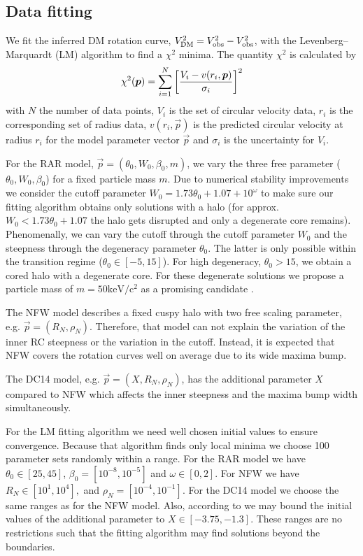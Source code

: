 \subsection{Data fitting}
We fit the inferred DM rotation curve, $V_\mathrm{DM}^2 = V_\mathrm{obs}^2 - V_\mathrm{obs}^2$, with the Levenberg–Marquardt (LM) algorithm to find a $\chi^2$ minima. The quantity $\chi^2$ is calculated by \begin{equation}
	\chi^2(\vec p) = \sum \limits_{i=1}^N \qbracket{\frac{V_i - v(r_i,\vec p)}{\sigma_i}}^2
\end{equation} with $N$ the number of data points, $V_i$ is the set of circular velocity data, $r_i$ is the corresponding set of radius data, $v(r_i,\vec p)$ is the predicted circular velocity at radius $r_i$ for the model parameter vector $\vec p$ and $\sigma_i$ is the uncertainty for $V_i$.

For the RAR model, $\vec p = (\theta_0, W_0, \beta_0, m)$, we vary the three free parameter ($\theta_0, W_0, \beta_0$) for a fixed particle mass $m$. Due to numerical stability improvements we consider the cutoff parameter $W_0 =  1.73 \theta_0 + 1.07 + 10^\omega$ to make sure our fitting algorithm obtains only solutions with a halo (for approx. $W_0 < 1.73 \theta_0 + 1.07$ the halo gets disrupted and only a degenerate core remains). Phenomenally, we can vary the cutoff through the cutoff parameter $W_0$ and the steepness through the degeneracy parameter $\theta_0$. The latter is only possible within the transition regime ($\theta_0 \in [-5,15]$). For high degeneracy, $\theta_0 > 15$, we obtain a cored halo with a degenerate core. For these degenerate solutions we propose a particle mass of $m = 50 \mathrm{keV/c^2}$ as a promising candidate \citep{RAR-II}.

The NFW model describes a fixed cuspy halo with two free scaling parameter, e.g. $\vec p = (R_N,\rho_N)$. Therefore, that model can not explain the variation of the inner RC steepness or the variation in the cutoff. Instead, it is expected that NFW covers the rotation curves well on average due to its wide maxima bump.

The DC14 model, e.g. $\vec p = (X,R_N,\rho_N)$, has the additional parameter $X$ compared to NFW which affects the inner steepness and the maxima bump width simultaneously.

For the LM fitting algorithm we need well chosen initial values to ensure convergence. Because that algorithm finds only local minima we choose 100 parameter sets randomly within a range. For the RAR model we have $\theta_0\in [25,45]$, $\beta_0 = [10^{-8},10^{-5}]$ and $\omega\in[0,2]$. For NFW we have $R_N\in[10^{1},10^{4}],$ and $\rho_N = [10^{-4},10^{-1}]$. For the DC14 model we choose the same ranges as for the NFW model. Also, according to \citet{2016arXiv160505971K} we may bound the initial values of the additional parameter to $X\in[-3.75,-1.3]$. These ranges are no restrictions such that the fitting algorithm may find solutions beyond the boundaries.